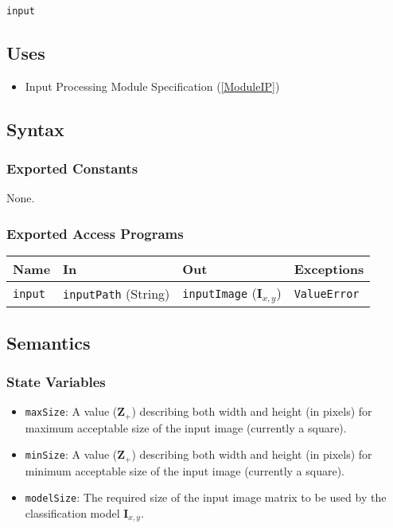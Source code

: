 \documentclass[12pt, titlepage]{article}
\def\code#1{\texttt{#1}}
\begin{document}
\code{input}

\subsection{Uses}

\begin{itemize}
  \item Input Processing Module Specification (\ref{ModuleIP})
\end{itemize}

\subsection{Syntax}

\subsubsection{Exported Constants}

None.

\subsubsection{Exported Access Programs}

\begin{center}
\begin{tabular}{p{2cm} p{4cm} p{4cm} p{2cm}}
\hline
\textbf{Name} & \textbf{In} & \textbf{Out} & \textbf{Exceptions} \\
\hline
\code{input} & \code{inputPath} (String) & \code{inputImage} ($\mathbf{I}_{x,y}$) & \code{ValueError} \\
\hline
\end{tabular}
\end{center}

\subsection{Semantics}

\subsubsection{State Variables}
\begin{itemize}
\item \code{maxSize}: A value ($\mathbf{Z}_{+}$) describing both width and height (in pixels) for maximum acceptable 
size of the input image (currently a square).
\item \code{minSize}: A value ($\mathbf{Z}_{+}$) describing both width and height (in pixels) for minimum acceptable 
size of the input image (currently a square).
\item \code{modelSize}: The required size of the input image matrix to be used by the classification model $\mathbf{I}_{x,y}$.
\end{itemize}
\end{document}
